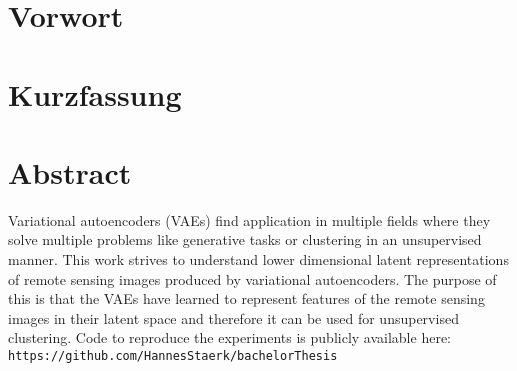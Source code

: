 \section{Vorwort}
\section{Kurzfassung}
\section{Abstract}

Variational autoencoders (VAEs) find application in multiple fields where they solve multiple problems like 
generative tasks or clustering in an unsupervised manner. This work strives to understand lower dimensional 
latent representations of remote sensing images produced by variational autoencoders. The purpose of this is that
the VAEs have learned to represent features of the remote sensing images in their latent space and therefore it
can be used for unsupervised clustering.
Code to reproduce the experiments is publicly available here:
\texttt{https://github.com/HannesStaerk/bachelorThesis}




